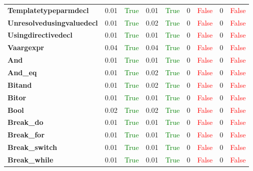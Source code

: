 \documentclass{article}
\begin{document}
\begin{xltabular}{\textwidth}{lcccccccc}
\textbf{{\fontsize{10}{12}\selectfont Templatetypeparmdecl}}& 0.01&\textcolor{green}{True}& 0.01&\textcolor{green}{True}& 0&\textcolor{red}{False}& 0&\textcolor{red}{False} \\[0.5ex]
\textbf{{\fontsize{10}{12}\selectfont Unresolvedusingvaluedecl}}& 0.01&\textcolor{green}{True}& 0.02&\textcolor{green}{True}& 0&\textcolor{red}{False}& 0&\textcolor{red}{False} \\[0.5ex]
\textbf{{\fontsize{10}{12}\selectfont Usingdirectivedecl}}& 0.01&\textcolor{green}{True}& 0.01&\textcolor{green}{True}& 0&\textcolor{red}{False}& 0&\textcolor{red}{False} \\[0.5ex]
\textbf{{\fontsize{10}{12}\selectfont Vaargexpr}}& 0.04&\textcolor{green}{True}& 0.04&\textcolor{green}{True}& 0&\textcolor{red}{False}& 0&\textcolor{red}{False} \\[0.5ex]
\textbf{{\fontsize{10}{12}\selectfont And}}& 0.01&\textcolor{green}{True}& 0.01&\textcolor{green}{True}& 0&\textcolor{red}{False}& 0&\textcolor{red}{False} \\[0.5ex]
\textbf{{\fontsize{10}{12}\selectfont And\_eq}}& 0.01&\textcolor{green}{True}& 0.02&\textcolor{green}{True}& 0&\textcolor{red}{False}& 0&\textcolor{red}{False} \\[0.5ex]
\textbf{{\fontsize{10}{12}\selectfont Bitand}}& 0.01&\textcolor{green}{True}& 0.02&\textcolor{green}{True}& 0&\textcolor{red}{False}& 0&\textcolor{red}{False} \\[0.5ex]
\textbf{{\fontsize{10}{12}\selectfont Bitor}}& 0.01&\textcolor{green}{True}& 0.01&\textcolor{green}{True}& 0&\textcolor{red}{False}& 0&\textcolor{red}{False} \\[0.5ex]
\textbf{{\fontsize{10}{12}\selectfont Bool}}& 0.02&\textcolor{green}{True}& 0.02&\textcolor{green}{True}& 0&\textcolor{red}{False}& 0&\textcolor{red}{False} \\[0.5ex]
\textbf{{\fontsize{10}{12}\selectfont Break\_do}}& 0.01&\textcolor{green}{True}& 0.01&\textcolor{green}{True}& 0&\textcolor{red}{False}& 0&\textcolor{red}{False} \\[0.5ex]
\textbf{{\fontsize{10}{12}\selectfont Break\_for}}& 0.01&\textcolor{green}{True}& 0.01&\textcolor{green}{True}& 0&\textcolor{red}{False}& 0&\textcolor{red}{False} \\[0.5ex]
\textbf{{\fontsize{10}{12}\selectfont Break\_switch}}& 0.01&\textcolor{green}{True}& 0.01&\textcolor{green}{True}& 0&\textcolor{red}{False}& 0&\textcolor{red}{False} \\[0.5ex]
\textbf{{\fontsize{10}{12}\selectfont Break\_while}}& 0.01&\textcolor{green}{True}& 0.01&\textcolor{green}{True}& 0&\textcolor{red}{False}& 0&\textcolor{red}{False} \\[0.5ex]

\end{xltabular}
\end{document}
